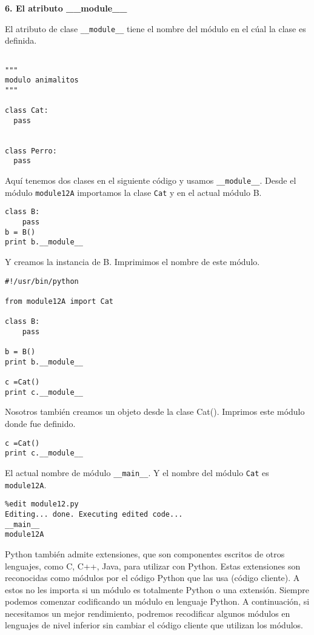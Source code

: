 \documentclass[twoside,10.5pt]{article}%
\begin{document}
\vspace{0.3cm}

\textbf{6. El atributo \_\_module\_\_}

 El atributo de clase \texttt{\_\_module\_\_} tiene el nombre del m\'odulo en el c\'ual la clase es definida.

\begin{verbatim}

"""
modulo animalitos
"""

class Cat:
  pass


class Perro:
  pass

\end{verbatim}

Aqu\'i tenemos dos clases en el siguiente c\'odigo y usamos  \texttt{\_\_module\_\_}. Desde el m\'odulo \texttt{module12A} importamos la clase \texttt{Cat} y en el actual m\'odulo B.

\begin{verbatim}
class B:
    pass
b = B()
print b.__module__
\end{verbatim}

Y creamos la instancia de B. Imprimimos el nombre de este m\'odulo.

\begin{verbatim}
#!/usr/bin/python

from module12A import Cat

class B:
    pass

b = B()
print b.__module__

c =Cat()
print c.__module__

\end{verbatim}


Nosotros tambi\'en creamos un objeto desde la clase Cat(). Imprimos este m\'odulo donde fue definido.


\begin{verbatim}
c =Cat()
print c.__module__
\end{verbatim}

El actual nombre de m\'odulo \texttt{\_\_main\_\_}. Y el nombre del m\'odulo \texttt{Cat} es \texttt{module12A}.
 
\begin{verbatim}
%edit module12.py
Editing... done. Executing edited code...
__main__
module12A
\end{verbatim}


Python tambi\'en admite extensiones, que son componentes escritos de otros lenguajes, como C, C++, Java, para utilizar con Python. Estas extensiones son reconocidas como m\'odulos por el c\'odigo Python que las usa (c\'odigo cliente). A estos no les importa si un m\'odulo es totalmente Python  o una extensi\'on. Siempre podemos comenzar codificando un m\'odulo en lenguaje Python. A continuaci\'on, si necesitamos un mejor rendimiento, podremos recodificar algunos m\'odulos en lenguajes de nivel inferior sin cambiar el c\'odigo cliente que utilizan los m\'odulos.
\end{document}
